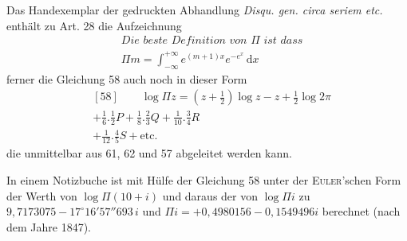 Das Handexemplar der gedruckten Abhandlung \textit{Disqu. gen. circa seriem etc.} enthält zu Art. 28 die Aufzeichnung
\[
\begin{aligned}&\textit{Die beste Definition von }\Pi\textit{ ist dass}\\&
\Pi m=\int_{-\infty}^{+\infty}e^{(m+1)x}e^{-e^x}\,\mathrm dx\end{aligned}
\]
ferner die Gleichung 58 auch noch in dieser Form
\[
\begin{aligned}&[58]\qquad \log\Pi z=(z+\tfrac12)\log z-z+\tfrac12\log2\pi\\&+\tfrac16.\tfrac12 P+\tfrac18.\tfrac23 Q+\tfrac1{10}.\tfrac34 R\\&+\tfrac1{12}.\tfrac45 S+\text{etc.}\end{aligned}
\]
die unmittelbar aus 61, 62 und 57 abgeleitet werden kann.

In einem Notizbuche ist mit Hülfe der Gleichung 58 unter der \textsc{Euler}'schen Form der Werth von $\log\Pi(10+i)$ und daraus der von $\log\Pi i$ zu
$9{,}7173075-17^\circ16'57''693\,i$ und
$\Pi i=+0{,}4980156-0{,}1549496i$ berechnet (nach dem Jahre 1847).

